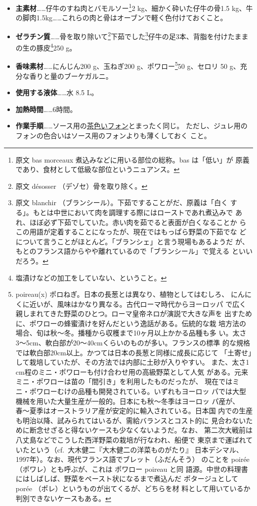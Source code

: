 \begin{recette}
\begin{itemize}
\item
  \textbf{主素材}\ldots{}\ldots{}仔牛のすね肉とバモルソー\footnote{原文
    bas morceaux 煮込みなどに用いる部位の総称。bas は「低い」が
    原義であり、食材として低級な部位というニュアンス。}2
  kg、細かく砕いた仔牛の骨1.5
  kg、牛の脚肉1.5kg\ldots{}\ldots{}これらの肉と骨はオーブンで軽く色付けておくこと。
\item
  \textbf{ゼラチン質}\ldots{}\ldots{}骨を取り除いて\footnote{原文
    désosser （デゾセ）骨を取り除く。}下茹でした\footnote{原文 blanchir
    （ブランシール）。下茹ですることがだ、原義は「白く
    する」。もとは中世において肉を調理する際にはローストであれ煮込みで
    あれ、ほぼ必ず下茹でしていた。赤い肉を茹でると表面が白くなることか
    らこの用語が定着することになったが、現在ではもっぱら野菜の下茹でな
    どについて言うことがほとんど。「ブランシェ」と言う現場もあるようだ
    が、もとのフランス語からやや離れているので「ブランシール」で覚える
    といいだろう。}仔牛の足3本、背脂を付けたままの生の豚皮\footnote{塩漬けなどの加工をしていない、ということ。}250
  g。
\item
  \textbf{香味素材}\ldots{}\ldots{}にんじん200 g、玉ねぎ200
  g、ポワロー\footnote{poireau(x)
    ポロねぎ。日本の長葱とは異なり、植物としてはむしろ、
    にんにくに近いが、風味はかなり異なる。古代ローマ時代からヨーロッパ
    で広く親しまれてきた野菜のひとつ。ローマ皇帝ネロが演説で大きな声を
    出すために、ポワローの蜂蜜漬けを好んだという逸話がある。伝統的な栽
    培方法の場合、旬は秋〜冬。播種から収穫まで10ヶ月以上かかる品種も多
    い。太さ3〜5cm、軟白部が20〜40cmくらいのものが多い。フランスの標準
    的な規格では軟白部20cm以上。かつては日本の長葱と同様に成長に応じて
    「土寄せ」して栽培していたが、その方法では内部に土砂が入りやすい。
    また、太さ1 cm程のミニ・ポワローも付け合わせ用の高級野菜として人気
    がある。元来ミニ・ポワローは苗の「間引き」を利用したものだったが、
    現在ではミニ・ポワローむけの品種も開発されている。いずれもヨーロッ
    パでは大型機械を用いた大量生産が一般的。日本にも秋〜冬季はヨーロッ
    パ産が、春〜夏季はオーストラリア産が安定的に輸入されている。日本国
    内での生産も明治以降、試みられてはいるが、需給バランスとコスト的に
    見合わないために断念せざると得ないケースも少なくないようだ。なお、
    第二次大戦前は八丈島などでこうした西洋野菜の栽培が行なわれ、船便で
    東京まで運ばれていたという（cf.~大木健二『大木健二の洋菜ものがたり』
    日本デシマル、1997年）。なお、現代フランス語でブレット（ふだんそう）
    のことを poirée （ポワレ）とも呼ぶが、これは ポワロー poireau と同
    語源。中世の料理書にはしばしば、野菜をペースト状になるまで煮込んだ
    ポタージュとして porée （ポレ）というものが出てくるが、どちらを材
    料として用いているか判別できないケースもある。}50 g、セロリ 50
  g、充分な香りと量のブーケガルニ。
\item
  \textbf{使用する液体}\ldots{}\ldots{}水 8.5 L。
\item
  \textbf{加熱時間}\ldots{}\ldots{}6時間。
\item
  \textbf{作業手順}\ldots{}\ldots{}ソース用の\protect\hyperlink{fonds-brun}{茶色いフォン}とまったく同じ。
  ただし、ジュレ用のフォンの色合いはソース用のフォンよりも薄くしておく
  こと。
\end{itemize}


\end{recette}
